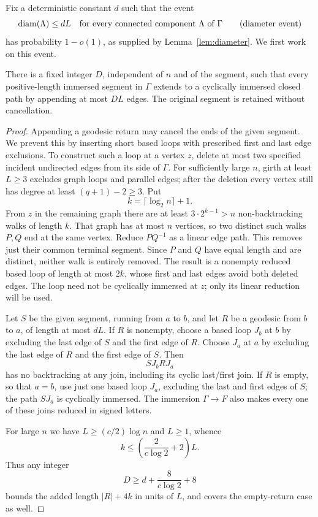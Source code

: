 Fix a deterministic constant $d$ such that the event
\[
 \operatorname{diam}(\Lambda)\le dL
 \quad\text{for every connected component $\Lambda$ of $\Gamma$}
 \tag*{\textnormal{(diameter event)}}
\]
has probability $1-o(1)$, as supplied by Lemma~\ref{lem:diameter}.
We first work on this event.

\begin{lemma}
\label{lem:short-closure}
There is a fixed integer $D$, independent of $n$ and of the segment,
such that every positive-length immersed segment in $\Gamma$ extends to
a cyclically immersed closed path by appending at most $DL$ edges.
The original segment is retained without cancellation.
\end{lemma}

\begin{proof}
Appending a geodesic return may cancel the ends of the given segment.
We prevent this by inserting short based loops with prescribed first
and last edge exclusions.  To construct such a loop at a vertex $z$,
delete at most two specified incident undirected edges from its
side of $\Gamma$.  For sufficiently large $n$, girth at least $L\ge3$
excludes graph loops and parallel edges; after the deletion every vertex
still has degree at least $(q+1)-2\ge3$.  Put
\[
 k=\lceil\log_2 n\rceil+1.
\]
From $z$ in the remaining graph there are at least $3\cdot2^{k-1}>n$
non-backtracking walks of length $k$.  That graph has at most $n$
vertices, so two distinct such walks $P,Q$ end at the same vertex.
Reduce $PQ^{-1}$ as a linear edge path.  This removes just their common
terminal segment.  Since $P$ and $Q$ have equal length and are distinct,
neither walk is entirely removed.  The result is a nonempty reduced
based loop of length at most $2k$, whose first and last edges avoid both
deleted edges.  The loop need not be cyclically immersed at $z$; only
its linear reduction will be used.

Let $S$ be the given segment, running from $a$ to $b$, and let $R$ be a
geodesic from $b$ to $a$, of length at most $dL$.  If $R$ is nonempty,
choose a based loop $J_b$ at $b$ by excluding the last edge of $S$ and
the first edge of $R$.  Choose $J_a$ at $a$ by excluding the last edge
of $R$ and the first edge of $S$.  Then
\[
 S J_b R J_a
\]
has no backtracking at any join, including its cyclic last/first join.
If $R$ is empty, so that $a=b$, use just one based loop $J_a$, excluding
the last and first edges of $S$; the path $SJ_a$ is cyclically immersed.
The immersion $\Gamma\to F$ also makes every one of these joins reduced
in signed letters.

For large $n$ we have $L\ge(c/2)\log n$ and $L\ge1$, whence
\[
 k\le \left(\frac{2}{c\log2}+2\right)L.
\]
Thus any integer
\[
 D\ge d+\frac{8}{c\log2}+8
\]
bounds the added length $|R|+4k$ in units of $L$, and covers the
empty-return case as well.
\end{proof}

